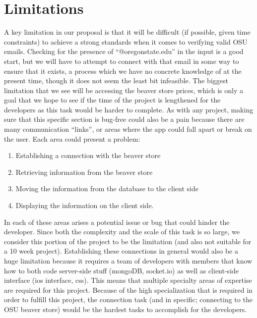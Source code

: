 \documentclass[12pt]{article}
\begin{document}
\section{Limitations}
\par A key limitation in our proposal is that it will be difficult (if possible, given time constraints) to achieve a strong standards when it comes to verifying valid OSU emails. Checking for the presence of “@oregonstate.edu” in the input is a good start, but we will have to attempt to connect with that email in some way to ensure that it exists, a process which we have no concrete knowledge of at the present time, though it does not seem the least bit infeasible. The biggest limitation that we see will be accessing the beaver store prices, which is only a goal that we hope to see if the time of the project is lengthened for the developers as this task would be harder to complete. As with any project, making sure that this specific section is bug-free could also be a pain because there are many communication “links”, or areas where the app could fall apart or break on the user. Each area could present a problem:
\begin{enumerate}
\item Establishing a connection with the beaver store
\item Retrieving information from the beaver store
\item Moving the information from the database to the client side
\item Displaying the information on the client side.
\end{enumerate}
\par In each of these areas arises a potential issue or bug that could hinder the developer. Since both the complexity and the scale of  this task is so large, we consider this portion of the project to be the limitation (and also not suitable for a 10 week project). Establishing these connections in general would also be a huge limitation because it requires a team of developers with members that know how to both code server-side stuff (mongoDB, socket.io) as well as client-side interface (ios interface, css). This means that multiple specialty areas of expertise are required for this project. Because of the high specialization that is required in order to fulfill this project, the connection task (and in specific; connecting to the OSU beaver store) would be the hardest tasks to accomplish for the developers. 
\end{document}
